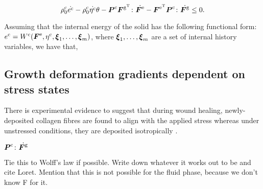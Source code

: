 \begin{equation*}
\rho_{0}^{\mathrm{c}} \dot{e^{\mathrm{c}}}
- \rho_{0}^{\mathrm{c}} \dot{\eta^{\mathrm{c}}} \theta
- \mbox{\boldmath$ P$}^{\mathrm{c}} \mbox{\boldmath$ F$}^{\mathrm{g}^{\mathrm{T}}} \colon
\dot{\mbox{\boldmath$ F$}^{\mathrm{e}}}
- \mbox{\boldmath$ F$}^{\mathrm{e}^{\mathrm{T}}}  \mbox{\boldmath$ P$}^{\mathrm{c}} \colon
\dot{\mbox{\boldmath$ F$}^{\mathrm{g}}}
\leq 0.
\end{equation*}

Assuming that the internal energy of the solid has the following
functional form: $e^{\mathrm{c}}=W^{\mathrm{c}}(\mbox{\boldmath$ F$}^{\mathrm{e}},\eta^{\mathrm{c}},
\mbox{\boldmath$\xi$}_{1},\ldots,\mbox{\boldmath$\xi$}_{m})$, where $\mbox{\boldmath$\xi$}_{1},\ldots,\mbox{\boldmath$\xi$}_{m}$ are a set
of internal history variables, we have that,


\subsection{Growth deformation gradients dependent on stress states}
\label{eu-stress-dependent-growth}

There is experimental evidence to suggest that during wound healing,
newly-de\-po\-sit\-ed collagen fibres are found to align with the
applied stress whereas under unstressed conditions, they are deposited
isotropically \citep{Provenzanoetal:2003}.

$\mbox{\boldmath$ P$}^{\mathrm{c}} \colon
\dot{\mbox{\boldmath$ F$}^{\mathrm{g}}}$

Tie this to Wolff's law if possible. Write down whatever it works out
to be and cite Loret. Mention that this is not possible for the fluid
phase, because we don't know F for it.

%

